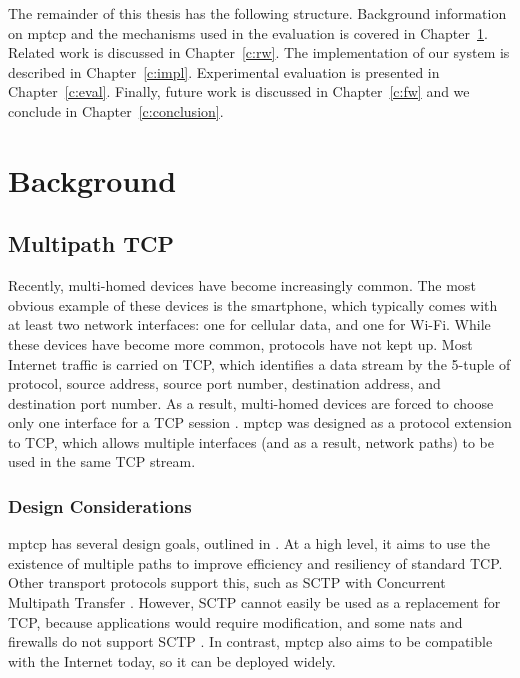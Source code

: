 \documentclass{cwru}
\begin{document}
The remainder of this thesis has the following structure. Background information
on \ac{mptcp} and the mechanisms used in the evaluation is covered in
Chapter~\ref{c:bg}. Related work is discussed in Chapter~\ref{c:rw}. The
implementation of our system is described in Chapter~\ref{c:impl}. Experimental
evaluation is presented in Chapter~\ref{c:eval}. Finally, future work is
discussed in Chapter~\ref{c:fw} and we conclude in Chapter~\ref{c:conclusion}.

\chapter{Background}
\label{c:bg}

\section{Multipath TCP}

Recently, multi-homed devices have become increasingly common. The most obvious
example of these devices is the smartphone, which typically comes with at least
two network interfaces: one for cellular data, and one for Wi-Fi. While these
devices have become more common, protocols have not kept up. Most Internet
traffic is carried on TCP, which identifies a data stream by the 5-tuple of
protocol, source address, source port number, destination address, and
destination port number. As a result, multi-homed devices are forced to choose
only one interface for a TCP session \cite{raiciu2012hard}. \ac{mptcp} was
designed as a protocol extension to TCP, which allows multiple interfaces (and
as a result, network paths) to be used in the same TCP stream.

\subsection{Design Considerations}

\ac{mptcp} has several design goals, outlined in \cite{rfc6182}. At a high
level, it aims to use the existence of multiple paths to improve efficiency and
resiliency of standard TCP. Other transport protocols support this, such as SCTP
with Concurrent Multipath Transfer \cite{iyengar2006concurrent}. However, SCTP
cannot easily be used as a replacement for TCP, because applications would
require modification, and some \acp{nat} and firewalls do not support SCTP
\cite{barre2011multipath}. In contrast, \ac{mptcp} also aims to be compatible
with the Internet today, so it can be deployed widely.
\end{document}
